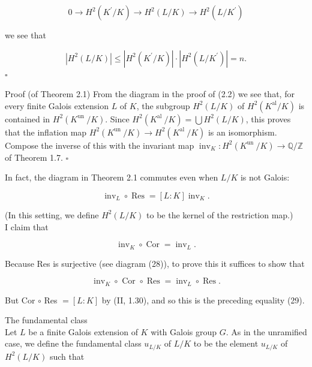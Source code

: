 \documentclass[10pt]{article}
\begin{document}
$$
0 \rightarrow H^{2}\left(K^{\prime} / K\right) \rightarrow H^{2}(L / K) \rightarrow H^{2}\left(L / K^{\prime}\right)
$$

we see that

$$
\left|H^{2}(L / K)\right| \leq\left|H^{2}\left(K^{\prime} / K\right)\right| \cdot\left|H^{2}\left(L / K^{\prime}\right)\right|=n .
$$ \(\square\)

Proof (of Theorem 2.1) From the diagram in the proof of (2.2) we see that, for every finite Galois extension $L$ of $K$, the subgroup $H^{2}(L / K)$ of $H^{2}\left(K^{\mathrm{al}} / K\right)$ is contained in $H^{2}\left(K^{\text {un }} / K\right)$. Since $H^{2}\left(K^{\text {al }} / K\right)=\bigcup H^{2}(L / K)$, this proves that the inflation map $H^{2}\left(K^{\text {un }} / K\right) \rightarrow H^{2}\left(K^{\text {al }} / K\right)$ is an isomorphism. Compose the inverse of this with the invariant map $\operatorname{inv}_{K}: H^{2}\left(K^{\text {un }} / K\right) \rightarrow \mathbb{Q} / \mathbb{Z}$ of Theorem 1.7. \(\square\)

In fact, the diagram in Theorem 2.1 commutes even when $L / K$ is not Galois:


\begin{equation*}
\operatorname{inv}_{L} \circ \operatorname{Res}=[L: K] \operatorname{inv}_{K} . \tag{29}
\end{equation*}


(In this setting, we define $H^{2}(L / K)$ to be the kernel of the restriction map.)\\
I claim that


\begin{equation*}
\operatorname{inv}_{K} \circ \operatorname{Cor}=\operatorname{inv}_{L} . \tag{30}
\end{equation*}


Because Res is surjective (see diagram (28)), to prove this it suffices to show that

$$
\operatorname{inv}_{K} \circ \text { Cor } \circ \operatorname{Res}=\operatorname{inv}_{L} \circ \operatorname{Res} .
$$

But Cor $\circ$ Res $=[L: K]$ by (II, 1.30), and so this is the preceding equality (29).

The fundamental class\\
Let $L$ be a finite Galois extension of $K$ with Galois group $G$. As in the unramified case, we define the fundamental class $u_{L / K}$ of $L / K$ to be the element $u_{L / K}$ of $H^{2}(L / K)$ such that
\end{document}

